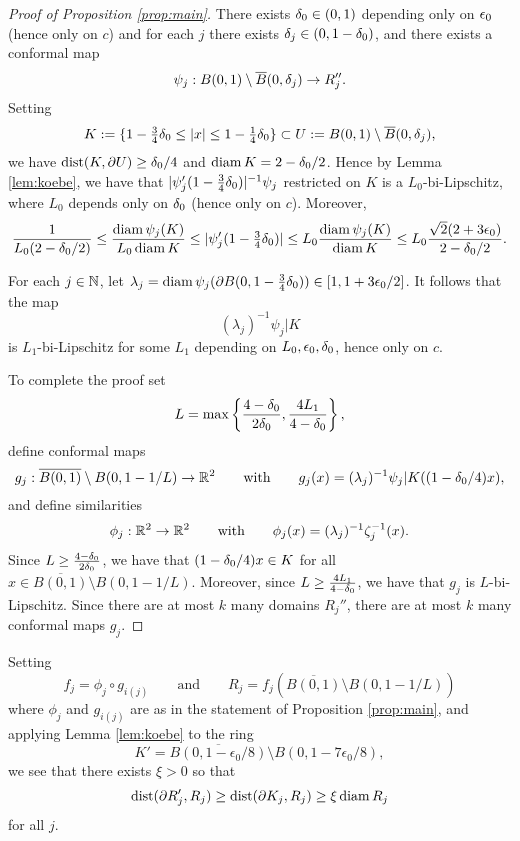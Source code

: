 \documentclass{amsart}
\DeclareMathOperator{\dist}{dist}
\begin{document}
\begin{proof}[{Proof of Proposition \ref{prop:main}}]
There exists $\delta_0\in (0,1)$ depending only on $\epsilon_0$ (hence only on $c$) and for each $j$ there exists $\delta_j \in (0,1-\delta_0)$, and there exists a conformal map 
\[ \psi_j : B(0,1) \setminus \overline{B}(0,\delta_j) \to R_j'' .\] 
Setting
\[ K := \{ 1 - \tfrac34 \delta_0 \leq |x| \leq 1 -\tfrac14 \delta_0\} \subset  U:= B(0,1) \setminus \overline{B}(0,\delta_j), \]
we have $\dist ( K, \partial U) \geq \d_0/4$ and $\operatorname{diam}{K} = 2-\delta_0/2$. Hence by Lemma \ref{lem:koebe},
we have that $|\psi_j'(1 - \tfrac34 \delta_0)|^{-1}\psi_j$ restricted on $K$ is a $L_0$-bi-Lipschitz, where $L_0$ depends only on $\delta_0$ (hence only on $c$). Moreover,
\[ \frac1{L_0(2-\delta_0/2)} \leq  \frac{\operatorname{diam}{\psi_j(K)}}{L_0\operatorname{diam}{K}} \leq  |\psi_j'(1 - \tfrac34 \delta_0)| \leq L_0\frac{\operatorname{diam}{\psi_j(K)}}{\operatorname{diam}{K}} \leq L_0\frac{\sqrt{2}(2+3\epsilon_0)}{2-\delta_0/2}.\]

For each $j \in\mathbb{N}$, let $\lambda_{j} = \operatorname{diam}{\psi_j(\partial B(0, 1 - \frac34\delta_0))} \in [1,1+3\epsilon_0/2]$. It follows that the map 
\[ (\lambda_j)^{-1}\psi_j|K\] 
is $L_1$-bi-Lipschitz for some $L_1$ depending on $L_0,\epsilon_0,\delta_0$, hence only on $c$.


To complete the proof set 
\[ L = \max\left\{\frac{4-\delta_0}{2\delta_0}, \frac{4L_1}{4-\delta_0} \right\},\]
define conformal maps
\[g_j: \overline{B(0,1)} \setminus B(0,1-1/L) \to \mathbb{R}^2 \qquad \text{with}\qquad g_j(x) = (\lambda_j)^{-1}\psi_j|K((1-\delta_0/4)x),\]
and define similarities
\[ \phi_j : \mathbb{R}^2 \to \mathbb{R}^2 \qquad\text{with}\qquad \phi_j(x) = (\lambda_j)^{-1}\zeta_j^{-1}(x).\]
Since $L \geq \frac{4-\delta_0}{2\delta_0}$, we have that $(1-\delta_0/4)x \in K$ for all $x \in \overline{B(0,1)} \setminus B(0,1-1/L)$. Moreover, since $L\geq  \frac{4L_1}{4-\delta_0}$, we have that $g_j$ is $L$-bi-Lipschitz. Since there are at most $k$ many domains $R_j''$, there are at most $k$ many conformal maps $g_j$.
\end{proof}

Setting
\[ f_j = \phi_j \circ g_{i(j)} \qquad\text{and}\qquad R_j = f_j(\overline{B(0,1)} \setminus B(0,1-1/L))\]
where $\phi_j$ and $g_{i(j)}$ are as in the statement of Proposition \ref{prop:main}, and applying Lemma \ref{lem:koebe} to the ring 
\[ K' = \overline{B(0,1- \epsilon_0/8)} \setminus B(0,1-7\epsilon_0/8),\] 
we see that there exists $\xi >0$ so that
\begin{equation}
\label{eq:ringdist}
\dist ( \partial R_j' , R_j) \geq \dist ( \partial K_j , R_j) \geq \xi \diam{R_j}
\end{equation}
for all $j$.
\end{document}
